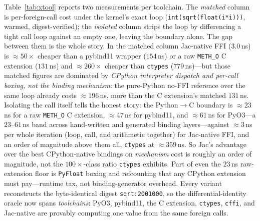 \documentclass[conference]{IEEEtran}
\newcommand{\code}[1]{\texttt{#1}}
\begin{document}
Table~\ref{tab:xtool} reports two measurements per toolchain. The \emph{matched}
column is per-foreign-call cost under the kernel's exact loop
(\code{int(sqrt(float(i*i)))}, warmed, digest-verified); the \emph{isolated}
column strips the loop by differencing a tight call loop against an empty one,
leaving the boundary alone. The gap between them is the whole story. In the
matched column Jac-native FFI ($3.0$\,ns) is $\approx$$50\times$ cheaper than a
pybind11 wrapper ($154$\,ns) or a raw \code{METH\_O} C extension ($131$\,ns) and
$\approx$$260\times$ cheaper than \code{ctypes} ($779$\,ns)---but those matched
figures are dominated by \emph{CPython interpreter dispatch and per-call boxing,
not the binding mechanism}: the pure-Python no-FFI reference over the same loop
already costs $\approx$$196$\,ns, more than the C extension's matched
$131$\,ns. Isolating the call itself tells the
honest story: the Python$\rightarrow$C boundary is $\approx$$23$\,ns for a raw
\code{METH\_O} C extension, $\approx$$47$\,ns for pybind11, and $\approx$$61$\,ns for
PyO3---a $23$--$61$\,ns band across hand-written and generated binding
layers---against $\approx$$3$\,ns per whole iteration (loop, call, and arithmetic
together) for Jac-native FFI, and an order of magnitude above them all,
\code{ctypes} at $\approx$$359$\,ns. So Jac's advantage over the best CPython-native
bindings on \emph{mechanism} cost is roughly an order of magnitude, not the
$100\times$-class ratio \code{ctypes} exhibits. Part of even the $23$\,ns
raw-extension floor is \code{PyFloat} boxing and refcounting that any CPython
extension must pay---runtime tax, not binding-generator overhead. Every variant
reconstructs the byte-identical digest \code{sqrt:2001000}, so the
differential-identity oracle now spans \emph{toolchains}: PyO3, pybind11, the C
extension, \code{ctypes}, \code{cffi}, and Jac-native are provably computing one
value from the same foreign calls.
\end{document}
